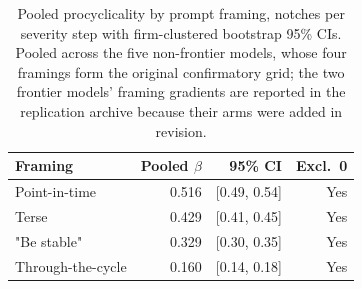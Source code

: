 \begin{table}[t]
\centering
\caption{Pooled procyclicality by prompt framing, notches per severity step with firm-clustered bootstrap 95\% CIs. Pooled across the five non-frontier models, whose four framings form the original confirmatory grid; the two frontier models' framing gradients are reported in the replication archive because their arms were added in revision.}
\label{tab:gradient}
\begin{tabular}{lrrr}
\toprule
Framing & Pooled $\beta$ & 95\% CI & Excl.\ 0 \\
\midrule
Point-in-time & 0.516 & [0.49, 0.54] & Yes \\
Terse & 0.429 & [0.41, 0.45] & Yes \\
"Be stable" & 0.329 & [0.30, 0.35] & Yes \\
Through-the-cycle & 0.160 & [0.14, 0.18] & Yes \\
\bottomrule
\end{tabular}
\end{table}